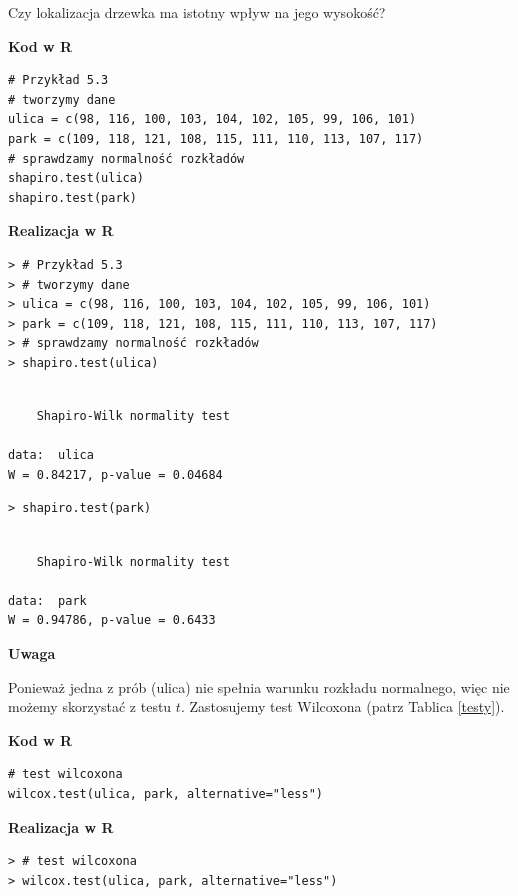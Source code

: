 \documentclass[12pt,B5paper,]{book}
\begin{document}
Czy lokalizacja drzewka ma istotny wpływ na jego wysokość?

\vspace{0.8cm} \textbf{Kod w R}

\begin{verbatim}
# Przykład 5.3 
# tworzymy dane
ulica = c(98, 116, 100, 103, 104, 102, 105, 99, 106, 101)
park = c(109, 118, 121, 108, 115, 111, 110, 113, 107, 117)
# sprawdzamy normalność rozkładów
shapiro.test(ulica)
shapiro.test(park)
\end{verbatim}

\newpage

\textbf{Realizacja w R}

\begin{verbatim}
> # Przykład 5.3 
> # tworzymy dane
> ulica = c(98, 116, 100, 103, 104, 102, 105, 99, 106, 101)
> park = c(109, 118, 121, 108, 115, 111, 110, 113, 107, 117)
> # sprawdzamy normalność rozkładów
> shapiro.test(ulica)
\end{verbatim}

\begin{verbatim}

    Shapiro-Wilk normality test

data:  ulica
W = 0.84217, p-value = 0.04684
\end{verbatim}

\begin{verbatim}
> shapiro.test(park)
\end{verbatim}

\begin{verbatim}

    Shapiro-Wilk normality test

data:  park
W = 0.94786, p-value = 0.6433
\end{verbatim}

\textbf{Uwaga}

Ponieważ jedna z prób (ulica) nie spełnia warunku rozkładu normalnego,
więc nie możemy skorzystać z testu \(t\). Zastosujemy test Wilcoxona
(patrz Tablica \ref{testy}).

\vspace{0.8cm} \textbf{Kod w R}

\begin{verbatim}
# test wilcoxona
wilcox.test(ulica, park, alternative="less")
\end{verbatim}

\newpage

\textbf{Realizacja w R}

\begin{verbatim}
> # test wilcoxona
> wilcox.test(ulica, park, alternative="less")
\end{verbatim}
\end{document}
